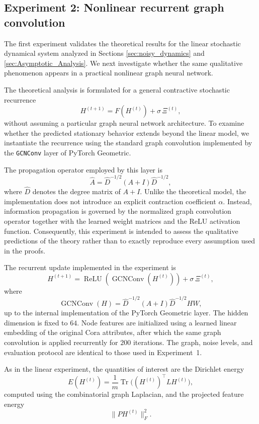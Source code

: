 \documentclass{article}
\begin{document}

\subsection{Experiment 2: Nonlinear recurrent graph convolution}

The first experiment validates the theoretical results for the linear
stochastic dynamical system analyzed in Sections
\ref{sec:noisy_dynamics} and
\ref{sec:Asymptotic_Analysis}.
We next investigate whether the same qualitative phenomenon appears in a
practical nonlinear graph neural network.

The theoretical analysis is formulated for a general contractive
stochastic recurrence
\[
H^{(t+1)} = F(H^{(t)}) + \sigma\,\Xi^{(t)},
\]
without assuming a particular graph neural network architecture.
To examine whether the predicted stationary behavior extends beyond the
linear model, we instantiate the recurrence using the standard graph
convolution implemented by the
\texttt{GCNConv} layer of PyTorch Geometric.

The propagation operator employed by this layer is
\[
\hat A
=
\hat D^{-1/2}(A+I)\hat D^{-1/2},
\]
where $\hat D$ denotes the degree matrix of $A+I$.
Unlike the theoretical model, the implementation does not introduce an
explicit contraction coefficient $\alpha$.
Instead, information propagation is governed by the normalized graph
convolution operator together with the learned weight matrices and the
ReLU activation function.
Consequently, this experiment is intended to assess the qualitative
predictions of the theory rather than to exactly reproduce every
assumption used in the proofs.

The recurrent update implemented in the experiment is
\[
H^{(t+1)}
=
\operatorname{ReLU}
\!\left(
\operatorname{GCNConv}(H^{(t)})
\right)
+
\sigma\,\Xi^{(t)},
\]
where
\[
\operatorname{GCNConv}(H)
=
\hat D^{-1/2}(A+I)\hat D^{-1/2}HW,
\]
up to the internal implementation of the PyTorch Geometric layer.
The hidden dimension is fixed to $64$.
Node features are initialized using a learned linear embedding of the
original Cora attributes, after which the same graph convolution is
applied recurrently for $200$ iterations.
The graph, noise levels, and evaluation protocol are identical to those
used in Experiment~1.

As in the linear experiment, the quantities of interest are the
Dirichlet energy
\[
E(H^{(t)})
=
\frac{1}{m}\operatorname{Tr}\bigl((H^{(t)})^{\top} L H^{(t)}\bigr),
\]
computed using the combinatorial graph Laplacian, and the projected
feature energy
\[
\|P H^{(t)}\|_F^2.
\]
\end{document}
